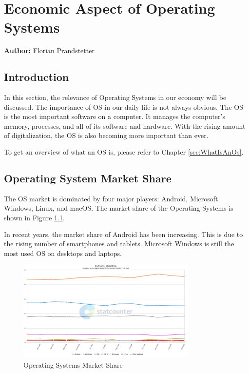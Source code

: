 \chapter{Economic Aspect of Operating Systems}
\label{chap:Economic_aspect_of_Operating_Systems}
\textbf{Author:} Florian Prandstetter

\section{Introduction}

In this section, the relevance of Operating Systems in our economy will be discussed. The importance of OS in our daily life is not always obvious.
The OS is the most important software on a computer. It manages the computer's memory, processes, and all of its software and hardware. 
With the rising amount of digitalization, the OS is also becoming more important than ever.

To get an overview of what an OS is, please refer to Chapter \ref{sec:WhatIsAnOs}.

\section{Operating System Market Share}

The OS market is dominated by four major players: Android, Microsoft Windows, Linux, and macOS.
The market share of the Operating Systems is shown in Figure \ref{fig:Operating_Systems_Market_Share}. 

In recent years, the market share of Android has been increasing. This is due to the rising number of smartphones and tablets.
Microsoft Windows is still the most used OS on desktops and laptops.

\begin{figure}[H]
    \centering
    \includegraphics[width=0.8\textwidth]{figures/StatCounter-os_combined-ww-monthly-202402-202502.png}
    \caption{Operating Systems Market Share}
    \label{fig:Operating_Systems_Market_Share}
\end{figure}
\cite{OsMarketShare2}

